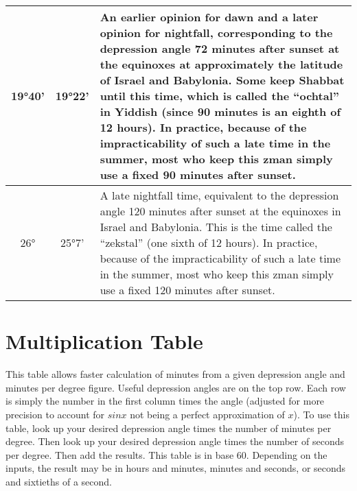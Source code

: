 \begin{tabular}{c | c | p{}}
	19°40'&19°22'&An earlier opinion for dawn and a later opinion for nightfall, corresponding to the depression angle 72 minutes after sunset at the equinoxes at approximately the latitude of Israel and Babylonia. Some keep Shabbat until this time, which is called the “ochtal” in Yiddish (since 90 minutes is an eighth of 12 hours). In practice, because of the impracticability of such a late time in the summer, most who keep this zman simply use a fixed 90 minutes after sunset.\\\hline
	26°&25°7'&A late nightfall time, equivalent to the depression angle 120 minutes after sunset at the equinoxes in Israel and Babylonia. This is the time called the “zekstal” (one sixth of 12 hours). In practice, because of the impracticability of such a late time in the summer, most who keep this zman simply use a fixed 120 minutes after sunset.\\\hline
\end{tabular}
\newpage
\section{Multiplication Table}

This table allows faster calculation of minutes from a given depression angle and minutes per degree figure. Useful depression angles are on the top row. Each row is simply the number in the first column times the angle (adjusted for more precision to account for $sin{x}$ not being a perfect approximation of $x$). To use this table, look up your desired depression angle times the number of minutes per degree. Then look up your desired depression angle times the number of seconds per degree. Then add the results. This table is in base 60. Depending on the inputs, the result may be in hours and minutes, minutes and seconds, or seconds and sixtieths of a second. 

